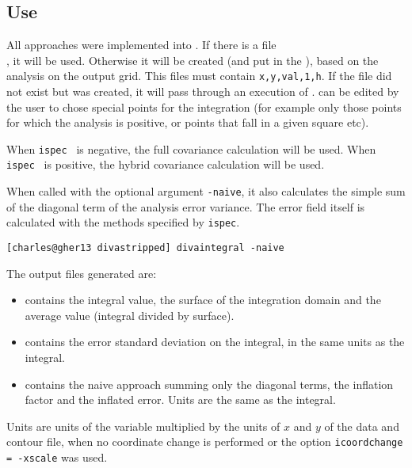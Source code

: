 \subsection{Use}

All approaches were implemented into . If there is a file\\ 
, it will be used.
Otherwise it will be created (and put in the ), based on the analysis on the output grid. This files must contain \texttt{x,y,val,1,h}. If the file did not exist but was created, it will pass through an execution of . 
 can be edited by the user to chose special points for the integration (for example only those points for which the analysis is positive, or points that fall in a given square etc). 

When {\tt ispec } is negative, the full covariance calculation will be used. When {\tt ispec } is positive, the hybrid covariance calculation will be used.

When called with the optional argument \texttt{-naive}, it also calculates the simple sum of the diagonal term of the analysis error variance. The error field itself is calculated with the methods specified by \texttt{ispec}. 

\begin{lstlisting}[style=Bash]
[charles@gher13 divastripped] divaintegral -naive
\end{lstlisting}

The output files generated are:
\begin{itemize}
\item {} contains the integral value, the surface of the integration domain and the average value (integral divided by surface).
\item {} contains the error standard deviation on the integral, in the same units as the integral.
\item {} contains the naive approach summing only the diagonal terms, the inflation factor and the inflated error. Units are the same as the integral.
\end{itemize}

Units are units of the variable multiplied by the units of $x$ and $y$ of the data and contour file, when no coordinate change is performed or the option {\tt icoordchange = -xscale} was used.

